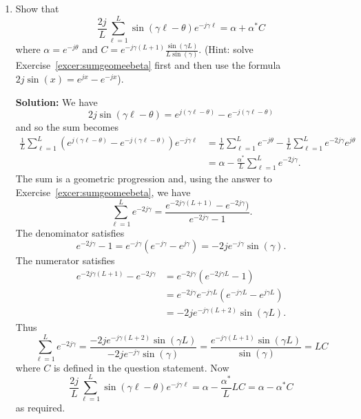 \documentclass[11pt,a4paper]{book}
\theoremstyle{plain}
\numberwithin{equation}{section}
\newenvironment{solution}{\begin{footnotesize}\textbf{Solution:}}{\end{footnotesize}}
\newenvironment{excersizelist}{%
  \renewcommand*{\theenumi}{\thechapter.\arabic{enumi}}%
  \newcommand\itemadvanced{\stepcounter{enumi}\item[$\ast$\, \theenumi.]}
  \begin{enumerate}
}{%
  \end{enumerate}
}
\begin{document}
\begin{excersizelist}
\item \label{excer:sumsinegeomean} Show that 
\[
\frac{2j}{L}\sum_{\ell=1}^{L}\sin( \gamma \ell - \theta)  e^{-j \gamma \ell} = \alpha + \alpha^*C
\]
where $\alpha = e^{-j\theta}$ and $C = e^{-j\gamma (L+1)}\frac{\sin(\gamma L)}{L\sin(\gamma)}$. (Hint: solve Exercise~\ref{excer:sumgeomeebeta} first and then use the formula $2j\sin(x) = e^{jx} -  e^{-jx}$).
\begin{solution}
We have 
\[
2j\sin(\gamma \ell - \theta) = e^{j(\gamma \ell - \theta)} -  e^{-j(\gamma \ell - \theta)}
\]
and so the sum becomes
\begin{align*}
\frac{1}{L}\sum_{\ell=1}^{L}(e^{j(\gamma \ell - \theta)} - e^{-j(\gamma \ell - \theta)})  e^{-j \gamma \ell} &= \frac{1}{L}\sum_{\ell=1}^{L}e^{-j\theta} - \frac{1}{L}\sum_{\ell=1}^{L}e^{-2j\gamma}e^{j\theta} \\
&= \alpha - \frac{\alpha^*}{L}\sum_{\ell=1}^{L}e^{-2j\gamma}.
\end{align*}
The sum is a geometric progression and, using the answer to Exercise~\ref{excer:sumgeomeebeta}, we have
\[
\sum_{\ell=1}^{L}e^{-2j\gamma} = \frac{e^{-2j\gamma (L+1)} - e^{-2j\gamma})}{e^{-2j\gamma} - 1}.
\]
The denominator satisfies
\[
e^{-2j\gamma} - 1 = e^{-j\gamma}(e^{-j\gamma} - e^{j\gamma}) = -2 j e^{-j\gamma} \sin(\gamma). 
\]
The numerator satisfies
\begin{align*}
e^{-2j\gamma (L+1)} - e^{-2j\gamma} &= e^{-2j\gamma}(e^{-2j\gamma L} - 1) \\
&= e^{-2j\gamma}e^{-j\gamma L} (e^{-j\gamma L} - e^{j\gamma L}) \\
&= -2 j e^{-j\gamma(L+2)} \sin(\gamma L).
\end{align*}
Thus
\[
\sum_{\ell=1}^{L}e^{-2j\gamma} = \frac{-2 j e^{-j\gamma(L+2)} \sin(\gamma L)}{-2 j e^{-j\gamma} \sin(\gamma)} = \frac{e^{-j\gamma(L+1)} \sin(\gamma L)}{ \sin(\gamma)} = L C
\]
where $C$ is defined in the question statement.  Now
\[
\frac{2j}{L}\sum_{\ell=1}^{L}\sin( \gamma \ell - \theta)  e^{-j \gamma \ell} = \alpha - \frac{\alpha^*}{L}LC = \alpha - \alpha^*C
\]
as required.
\end{solution}



\end{excersizelist}
\end{document}
